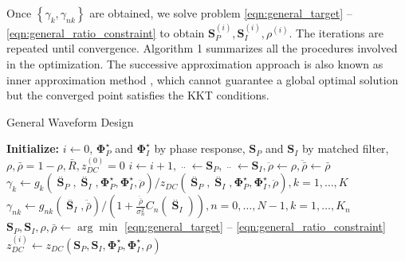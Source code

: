 Once $\left\{ {{\gamma _k},{\gamma _{nk}}} \right\}$ are obtained, we solve problem \ref{eqn:general_target} -- \ref{eqn:general_ratio_constraint} to obtain ${\mathbf{S}}_P^{(i)},{\mathbf{S}}_I^{(i)},{\rho ^{(i)}}$. The iterations are repeated until convergence. Algorithm 1 summarizes all the procedures involved in the optimization. The successive approximation approach is also known as inner approximation method \cite{Marks1978}, which cannot guarantee a global optimal solution but the converged point satisfies the KKT conditions.

\begin{algorithm}
  \caption{General Waveform Design}
  \label{alg:general}
  \begin{algorithmic}[1]
    \State \textbf{Initialize:} $i \leftarrow 0$, ${\mathbf{\Phi }}_P^ \star $ and ${\mathbf{\Phi }}_I^ \star $ by phase response, ${{\mathbf{S}}_P}$ and ${{\mathbf{S}}_I}$ by matched filter, $\rho ,\bar \rho  = 1 - \rho ,\bar R,z_{DC}^{(0)} = 0$
    \Repeat
      \State $i \leftarrow i + 1,\mathop {{{\mathbf{S}}_P}}\limits^{..}  \leftarrow {{\mathbf{S}}_P},\mathop {{{\mathbf{S}}_P}}\limits^{..}  \leftarrow {{\mathbf{S}}_I},\ddot \rho  \leftarrow \rho ,\ddot \bar \rho  \leftarrow \bar \rho $
      \State ${\gamma _k} \leftarrow {g_k}\left( {{{\mathop {\mathbf{S}}\limits^{..} }_P},{{\mathop {\mathbf{S}}\limits^{..} }_I},{\mathbf{\Phi }}_P^ \star ,{\mathbf{\Phi }}_I^ \star ,\ddot \rho } \right)/{z_{DC}}\left( {{{\mathop {\mathbf{S}}\limits^{..} }_P},{{\mathop {\mathbf{S}}\limits^{..} }_I},{\mathbf{\Phi }}_P^ \star ,{\mathbf{\Phi }}_I^ \star ,\ddot \rho } \right),k = 1, \ldots ,K$
      \State ${\gamma _{nk}} \leftarrow {g_{nk}}\left( {{{\mathop {\mathbf{S}}\limits^{..} }_I},\ddot \bar \rho } \right)/\left( {1 + \frac{{\ddot \bar \rho }}{{\sigma _n^2}}{C_n}\left( {{{\mathop {\mathbf{S}}\limits^{..} }_I}} \right)} \right),n = 0, \ldots ,N - 1,k = 1, \ldots ,{K_n}$
      \State ${{\mathbf{S}}_P},{{\mathbf{S}}_I},\rho ,\bar \rho  \leftarrow \arg \min $ \ref{eqn:general_target} -- \ref{eqn:general_ratio_constraint}
      \State $z_{DC}^{(i)} \leftarrow {z_{DC}}\left( {{{\mathbf{S}}_P},{{\mathbf{S}}_I},{\mathbf{\Phi }}_P^ \star ,{\mathbf{\Phi }}_I^ \star ,\rho } \right)$
  \end{algorithmic}
\end{algorithm} 